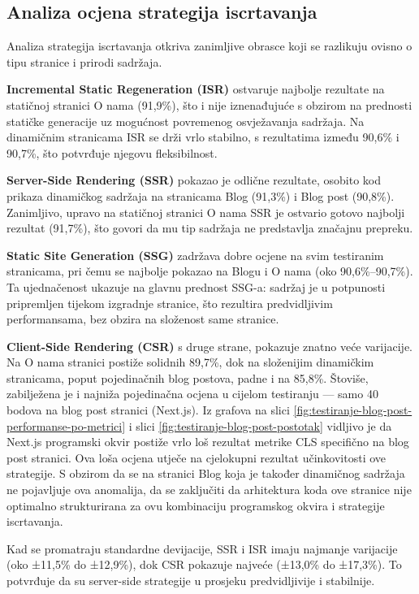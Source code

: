 \subsection{Analiza ocjena strategija iscrtavanja}

Analiza strategija iscrtavanja otkriva zanimljive obrasce koji se razlikuju ovisno o tipu stranice i prirodi sadržaja.

\textbf{Incremental Static Regeneration (ISR)} ostvaruje najbolje rezultate na statičnoj stranici O nama (91,9\%), što i nije iznenađujuće s obzirom na prednosti statičke generacije uz mogućnost povremenog osvježavanja sadržaja. Na dinamičnim stranicama ISR se drži vrlo stabilno, s rezultatima između 90,6\% i 90,7\%, što potvrđuje njegovu fleksibilnost.

\textbf{Server-Side Rendering (SSR)} pokazao je odlične rezultate, osobito kod prikaza dinamičkog sadržaja na stranicama Blog (91,3\%) i Blog post (90,8\%). Zanimljivo, upravo na statičnoj stranici O nama SSR je ostvario gotovo najbolji rezultat (91,7\%), što govori da mu tip sadržaja ne predstavlja značajnu prepreku.

\textbf{Static Site Generation (SSG)} zadržava dobre ocjene na svim testiranim stranicama, pri čemu se najbolje pokazao na Blogu i O nama (oko 90,6\%–90,7\%). Ta ujednačenost ukazuje na glavnu prednost SSG-a: sadržaj je u potpunosti pripremljen tijekom izgradnje stranice, što rezultira predvidljivim performansama, bez obzira na složenost same stranice.

\textbf{Client-Side Rendering (CSR)} s druge strane, pokazuje znatno veće varijacije. Na O nama stranici postiže solidnih 89,7\%, dok na složenijim dinamičkim stranicama, poput pojedinačnih blog postova, padne i na 85,8\%. Štoviše, zabilježena je i najniža pojedinačna ocjena u cijelom testiranju — samo 40 bodova na blog post stranici (Next.js). Iz grafova
na slici \ref{fig:testiranje-blog-post-performanse-po-metrici} i slici \ref{fig:testiranje-blog-post-postotak} vidljivo je da Next.js programski okvir postiže vrlo loš rezultat metrike CLS specifično na blog post stranici. Ova loša ocjena utječe na cjelokupni rezultat učinkovitosti ove strategije. S obzirom da se na stranici Blog koja je također dinamičnog sadržaja ne pojavljuje ova anomalija, da se zaključiti da arhitektura koda ove stranice nije optimalno strukturirana za ovu kombinaciju programskog okvira i strategije iscrtavanja.

Kad se promatraju standardne devijacije, SSR i ISR imaju najmanje varijacije (oko ±11,5\% do ±12,9\%), dok CSR pokazuje najveće (±13,0\% do ±17,3\%). To potvrđuje da su server-side strategije u prosjeku predvidljivije i stabilnije.

